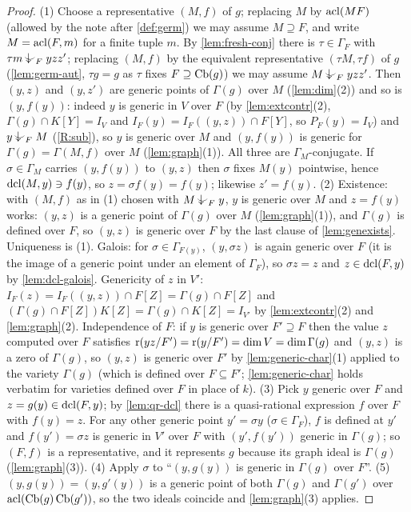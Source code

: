 \begin{proof}
(1) Choose a representative $(M,f)$ of $g$; replacing $M$ by $\operatorname{acl}(MF)$ (allowed by
the note after \cref{def:germ}) we may assume $M\supseteq F$, and write $M=\operatorname{acl}(F,m)$
for a finite tuple $m$.  By \cref{lem:fresh-conj} there is $\tau\in\Gamma_F$ with
$\tau m\ind{F}yzz'$; replacing $(M,f)$ by the equivalent representative
$(\tau M,\tau f)$ of $g$ (\cref{lem:germ-aut}, $\tau g=g$ as $\tau$ fixes
$F\supseteq\operatorname{Cb}(g)$) we may assume $M\ind{F}yzz'$.  Then $(y,z)$ and $(y,z')$ are
generic points of $\Gamma(g)$ over $M$ (\cref{lem:dim}(2)) and so is $(y,f(y))$:
indeed $y$ is generic in $V$ over $F$ (by \cref{lem:extcontr}(2), $\Gamma(g)\cap K[Y]=I_V$
and $I_F(y)=I_F((y,z))\cap F[Y]$, so $P_F(y)=I_V$) and $y\ind{F}M$ (\ref{R:sub}), so $y$ is
generic over $M$ and $(y,f(y))$ is generic for $\Gamma(g)=\Gamma(M,f)$ over $M$
(\cref{lem:graph}(1)).  All three are $\Gamma_M$-conjugate.  If $\sigma\in\Gamma_M$ carries
$(y,f(y))$ to $(y,z)$ then $\sigma$ fixes $M(y)$ pointwise, hence $\operatorname{dcl}(M,y)\ni f(y)$,
so $z=\sigma f(y)=f(y)$; likewise $z'=f(y)$.
(2) Existence: with $(M,f)$ as in (1) chosen with $M\ind{F}y$, $y$ is generic over
$M$ and $z=f(y)$ works: $(y,z)$ is a generic point of $\Gamma(g)$ over $M$
(\cref{lem:graph}(1)), and $\Gamma(g)$ is defined over $F$, so $(y,z)$ is generic over
$F$ by the last clause of \cref{lem:genexists}.  Uniqueness is (1).  Galois: for
$\sigma\in\Gamma_{F(y)}$, $(y,\sigma z)$ is again generic over $F$ (it is the image of a
generic point under an element of $\Gamma_F$), so $\sigma z=z$ and $z\in\operatorname{dcl}(F,y)$ by
\cref{lem:dcl-galois}.  Genericity of $z$ in $V'$: $I_F(z)=I_F((y,z))\cap F[Z]=
\Gamma(g)\cap F[Z]$ and $(\Gamma(g)\cap F[Z])K[Z]=\Gamma(g)\cap K[Z]=I_{V'}$ by
\cref{lem:extcontr}(2) and \cref{lem:graph}(2).  Independence of $F$: if $y$ is generic
over $F'\supseteq F$ then the value $z$ computed over $F$ satisfies $\operatorname{r}(yz/F')=\operatorname{r}(y/F')
=\dim V=\dim\Gamma(g)$ and $(y,z)$ is a zero of $\Gamma(g)$, so $(y,z)$ is generic over
$F'$ by \cref{lem:generic-char}(1) applied to the variety $\Gamma(g)$ (which is defined
over $F\subseteq F'$; \cref{lem:generic-char} holds verbatim for varieties defined over
$F$ in place of $k$).
(3) Pick $y$ generic over $F$ and $z=g(y)\in\operatorname{dcl}(F,y)$; by \cref{lem:qr-dcl} there is a
quasi-rational expression $f$ over $F$ with $f(y)=z$.  For any other generic point
$y'=\sigma y$ ($\sigma\in\Gamma_F$), $f$ is defined at $y'$ and $f(y')=\sigma z$ is generic
in $V'$ over $F$ with $(y',f(y'))$ generic in $\Gamma(g)$; so $(F,f)$ is a representative,
and it represents $g$ because its graph ideal is $\Gamma(g)$ (\cref{lem:graph}(3)).
(4) Apply $\sigma$ to ``$(y,g(y))$ is generic in $\Gamma(g)$ over $F$''.
(5) $(y,g(y))=(y,g'(y))$ is a generic point of both $\Gamma(g)$ and $\Gamma(g')$ over
$\operatorname{acl}(\operatorname{Cb}(g)\operatorname{Cb}(g'))$, so the two ideals coincide and \cref{lem:graph}(3) applies.
\end{proof}

